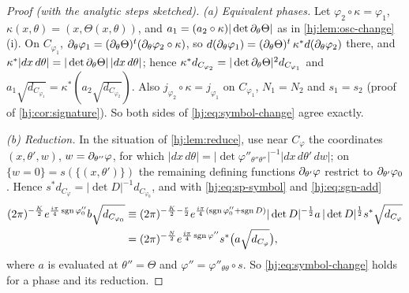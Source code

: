 \begin{proof}[Proof (with the analytic steps sketched)]
  \emph{(a) Equivalent phases.}  Let $\varphi_2\circ\kappa=\varphi_1$,
  $\kappa(x,\theta)=(x,\Theta(x,\theta))$, and $a_1=(a_2\circ\kappa)|\det
  \partial_\theta\Theta|$ as in \cref{hj:lem:osc-change}(i).  On $C_{\varphi_1}$,
  $\partial_\theta\varphi_1=(\partial_\theta\Theta)^t(\partial_\theta\varphi_2\circ\kappa)$, so
  $d(\partial_\theta\varphi_1)=(\partial_\theta\Theta)^t\,\kappa^*d(\partial_\theta\varphi_2)$
  there, and $\kappa^*|dx\,d\theta|=|\det\partial_\theta\Theta|\,|dx\,d\theta|$; hence
  $\kappa^*d_{C_{\varphi_2}}=|\det\partial_\theta\Theta|^2d_{C_{\varphi_1}}$ and
  $a_1\sqrt{d_{C_{\varphi_1}}}=\kappa^*(a_2\sqrt{d_{C_{\varphi_2}}})$.  Also
  $j_{\varphi_2}\circ\kappa=j_{\varphi_1}$ on $C_{\varphi_1}$, $N_1=N_2$ and
  $s_1=s_2$ (proof of \cref{hj:cor:signature}).  So both sides of
  \eqref{hj:eq:symbol-change} agree exactly.

  \emph{(b) Reduction.}  In the situation of \cref{hj:lem:reduce}, use near
  $C_\varphi$ the coordinates $(x,\theta',w)$, $w=\partial_{\theta''}\varphi$, for
  which $|dx\,d\theta|=|\det\varphi''_{\theta''\theta''}|^{-1}|dx\,d\theta'\,dw|$;
  on $\{w=0\}=s(\{(x,\theta')\})$ the remaining defining functions
  $\partial_{\theta'}\varphi$ restrict to $\partial_{\theta'}\varphi_0$.  Hence
  $s^*d_{C_\varphi}=|\det D|^{-1}d_{C_{\varphi_0}}$, and with
  \eqref{hj:eq:sp-symbol} and \eqref{hj:eq:sgn-add}
  \begin{align*}
    (2\pi)^{-\frac K2}e^{\frac{i\pi}4\operatorname{sgn}\varphi_0''}b\sqrt{d_{C_{\varphi_0}}}
    &\equiv(2\pi)^{-\frac K2-\frac r2}e^{\frac{i\pi}4(\operatorname{sgn}\varphi_0''+\operatorname{sgn} D)}
    |\det D|^{-\frac12}a\,|\det D|^{\frac12}s^*\sqrt{d_{C_\varphi}}\\
    &=(2\pi)^{-\frac N2}e^{\frac{i\pi}4\operatorname{sgn}\varphi''}s^*\big(a\sqrt{d_{C_\varphi}}\big),
  \end{align*}
  where $a$ is evaluated at $\theta''=\Theta$ and $\varphi''=\varphi''_{\theta\theta}\circ s$.
  So \eqref{hj:eq:symbol-change} holds for a phase and its reduction.


\end{proof}
